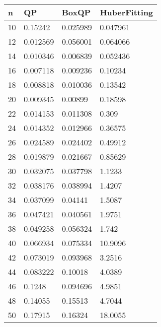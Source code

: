 \begin{tabular}{llll}
n & QP & BoxQP & HuberFitting \\ 
\hline 
10 & 0.15242 & 0.025989 & 0.047961 \\ 
12 & 0.012569 & 0.056001 & 0.064066 \\ 
14 & 0.010346 & 0.006839 & 0.052436 \\ 
16 & 0.007118 & 0.009236 & 0.10234 \\ 
18 & 0.008818 & 0.010036 & 0.13542 \\ 
20 & 0.009345 & 0.00899 & 0.18598 \\ 
22 & 0.014153 & 0.011308 & 0.309 \\ 
24 & 0.014352 & 0.012966 & 0.36575 \\ 
26 & 0.024589 & 0.024402 & 0.49912 \\ 
28 & 0.019879 & 0.021667 & 0.85629 \\ 
30 & 0.032075 & 0.037798 & 1.1233 \\ 
32 & 0.038176 & 0.038994 & 1.4207 \\ 
34 & 0.037099 & 0.04141 & 1.5087 \\ 
36 & 0.047421 & 0.040561 & 1.9751 \\ 
38 & 0.049258 & 0.056324 & 1.742 \\ 
40 & 0.066934 & 0.075334 & 10.9096 \\ 
42 & 0.073019 & 0.093968 & 3.2516 \\ 
44 & 0.083222 & 0.10018 & 4.0389 \\ 
46 & 0.1248 & 0.094696 & 4.9851 \\ 
48 & 0.14055 & 0.15513 & 4.7044 \\ 
50 & 0.17915 & 0.16324 & 18.0055 \\ 
\hline 
\end{tabular}